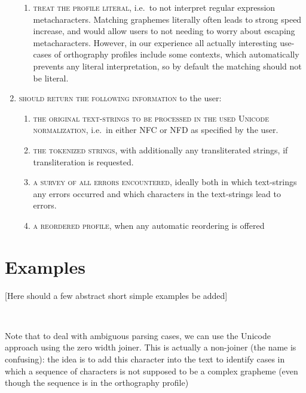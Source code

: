 \begin{enumerate}
\begin{enumerate}
		\item \textsc{treat the profile literal}, i.e.~to not interpret regular expression metacharacters. Matching graphemes literally often leads to strong speed increase, and would allow users to not needing to worry about escaping metacharacters. However, in our experience all actually interesting use-cases of orthography profiles include some contexts, which automatically prevents any literal interpretation, so by default the matching should not be literal. 
	\end{enumerate}
	\item \textsc{should return the following information} to the user:
	\begin{enumerate}
		\def\labelenumii{\arabic{enumii}.} \setcounter{enumii}{8} 
		\item \textsc{the original text-strings to be processed in the used Unicode normalization}, i.e.~in either NFC or NFD as specified by the user. 
		\item \textsc{the tokenized strings}, with additionally any transliterated
        strings, if transliteration is requested. 
		\item \textsc{a survey of all errors encountered}, ideally both in which
        text-strings any errors occurred and which characters in the
        text-strings lead to errors. 
		\item \textsc{a reordered profile}, when any automatic reordering is offered 
	\end{enumerate}
\end{enumerate}

\section{Examples}

[Here should a few abstract short simple examples be added]

\ 

Note that to deal with ambiguous parsing cases, we can use the Unicode approach
using the zero width joiner. This is actually a non-joiner (the name is
confusing): the idea is to add this character into the text to identify cases in
which a sequence of characters is not supposed to be a complex grapheme (even
though the sequence is in the orthography profile)

